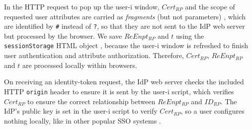 In the HTTP request to pop up the user-i window, $Cert_{RP}$ and the scope of requested user attributes are carried as \emph{fragments} (but not parameters) \cite{url-fragment}, which are identified by \texttt{\#} instead of \texttt{?},
    so that they are not sent to the IdP web server but processed by the browser.
We save $ReEnpt_{RP}$ and $t$ using the \verb+sessionStorage+ HTML object \cite{sessionStorageHtml},
    because the user-i window is refreshed to finish user authentication and attribute authorization.
Therefore, $Cert_{RP}$, $ReEnpt_{RP}$ and $t$ are processed locally within browsers.


On receiving an identity-token request, the IdP web server checks the included HTTP \texttt{origin} header to ensure it is sent by the user-i script,
which verifies $Cert_{RP}$ to ensure the correct relationship between $ReEnpt_{RP}$ and $ID_{RP}$.
The IdP's public key is set in the user-i script to verify $Cert_{RP}$,
so a user configures nothing locally,
 like in other popular SSO systems \cite{OpenIDConnect, rfc6749, SAML, SAMLIdentifier}.


